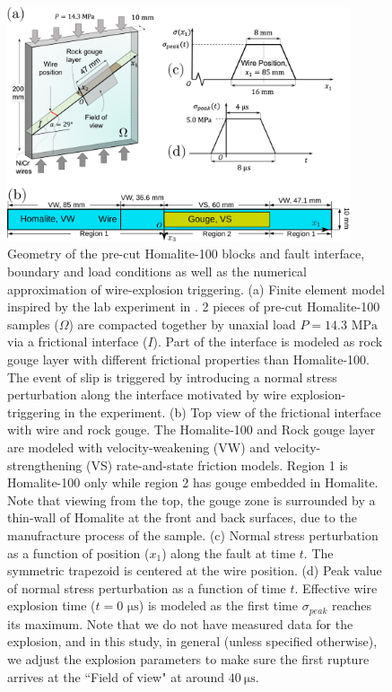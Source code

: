 \documentclass[final,a4paper]{elsarticle}
\begin{document}
\begin{figure}[htbp]
    \centering
    \includegraphics[width = 0.9\textwidth]{figure1.pdf}
    \caption{Geometry of the pre-cut Homalite-100 blocks and fault interface,  boundary and load conditions as well as the numerical approximation of wire-explosion triggering. 
(a) Finite element model inspired by the lab experiment in \cite{Rubino2022}. 2 pieces of pre-cut Homalite-100 samples ($\Omega$) are compacted together by unaxial load $P = 14.3$ $\mathrm{MPa}$ via a frictional interface ($I$). Part of the interface is modeled as rock gouge layer with different frictional properties than Homalite-100. The event of slip is triggered by introducing a normal stress perturbation along the interface motivated by wire explosion-triggering in the experiment. 
(b) Top view of the frictional interface with wire and rock gouge. The Homalite-100 and Rock gouge layer are modeled with velocity-weakening (VW) and velocity-strengthening (VS) rate-and-state friction models. Region 1 is Homalite-100 only while region 2 has gouge embedded in Homalite.
Note that viewing from the top, 
the gouge zone is surrounded by a thin-wall of Homalite at the front and back surfaces, 
due to the manufracture process of the sample. 
(c) Normal stress perturbation as a function of position ($x_1$) along the fault at time $t$. The symmetric trapezoid is centered at the wire position.
(d) Peak value of normal stress perturbation as a function of time $t$. Effective wire explosion time ($t=0$ $\mathrm{\mu s}$) is modeled as the first time $\sigma_{peak}$ reaches its maximum. 
Note that we do not have measured data for the explosion, and in this study, 
in general (unless specified otherwise), 
we adjust the explosion parameters to make sure the first rupture arrives at the ``Field of view" at around $40\ \mathrm{\mu s}$.}
    \label{fig:figure1}
\end{figure}
\end{document}
